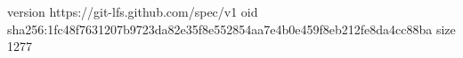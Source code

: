 version https://git-lfs.github.com/spec/v1
oid sha256:1fc48f7631207b9723da82e35f8e552854aa7e4b0e459f8eb212fe8da4cc88ba
size 1277

